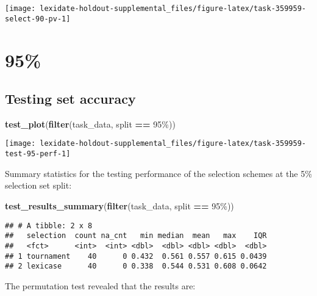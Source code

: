 \documentclass[
]{book}
\newenvironment{Shaded}{\begin{snugshade}}{\end{snugshade}}
\newcommand{\FunctionTok}[1]{\textcolor[rgb]{0.13,0.29,0.53}{\textbf{#1}}}
\newcommand{\NormalTok}[1]{#1}
\newcommand{\SpecialCharTok}[1]{\textcolor[rgb]{0.81,0.36,0.00}{\textbf{#1}}}
\newcommand{\StringTok}[1]{\textcolor[rgb]{0.31,0.60,0.02}{#1}}
\begin{document}
\texttt{[image: lexidate-holdout-supplemental\_files/figure-latex/task-359959-select-90-pv-1]}

\hypertarget{section-39}{%
\section{95\%}\label{section-39}}

\hypertarget{testing-set-accuracy-39}{%
\subsection{Testing set accuracy}\label{testing-set-accuracy-39}}

\begin{Shaded}
\begin{Highlighting}[]
\FunctionTok{test\_plot}\NormalTok{(}\FunctionTok{filter}\NormalTok{(task\_data, split }\SpecialCharTok{==} \StringTok{\textquotesingle{}95\%\textquotesingle{}}\NormalTok{))}
\end{Highlighting}
\end{Shaded}

\texttt{[image: lexidate-holdout-supplemental\_files/figure-latex/task-359959-test-95-perf-1]}

Summary statistics for the testing performance of the selection schemes at the 5\% selection set split:

\begin{Shaded}
\begin{Highlighting}[]
\FunctionTok{test\_results\_summary}\NormalTok{(}\FunctionTok{filter}\NormalTok{(task\_data, split }\SpecialCharTok{==} \StringTok{\textquotesingle{}95\%\textquotesingle{}}\NormalTok{))}
\end{Highlighting}
\end{Shaded}

\begin{verbatim}
## # A tibble: 2 x 8
##   selection  count na_cnt   min median  mean   max    IQR
##   <fct>      <int>  <int> <dbl>  <dbl> <dbl> <dbl>  <dbl>
## 1 tournament    40      0 0.432  0.561 0.557 0.615 0.0439
## 2 lexicase      40      0 0.338  0.544 0.531 0.608 0.0642
\end{verbatim}

The permutation test revealed that the results are:
\end{document}
